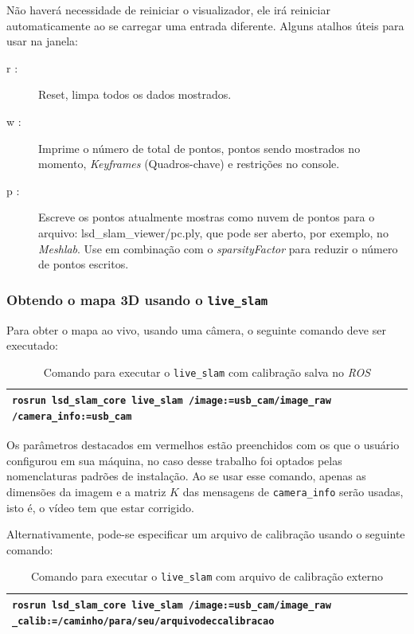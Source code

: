 Não haverá necessidade de reiniciar o visualizador, ele irá reiniciar automaticamente ao se carregar uma entrada diferente. Alguns atalhos úteis para usar na janela:

\begin{description}
	\item[r :]{Reset, limpa todos os dados mostrados.}
	\item[w :]{Imprime o número de total de pontos, pontos sendo mostrados no momento, \textit{Keyframes} (Quadros-chave) e restrições no console.}
	\item[p :]{Escreve os pontos atualmente mostras como nuvem de pontos para o arquivo: lsd\_slam\_viewer/pc.ply, que pode ser aberto, por exemplo, no \textit{Meshlab}. Use  em combinação com o \textit{sparsityFactor}  para reduzir o número de pontos escritos.}
\end{description}	

\subsubsection{Obtendo o mapa 3D usando o \texttt{live\_slam}}

Para obter o mapa ao vivo, usando uma câmera, o seguinte comando deve ser executado:

\begin{table}[!ht]\label{tb:14}
\begin{tabular}{| p{\textwidth}|}
\hline
\texttt{rosrun lsd\_slam\_core live\_slam /image:=usb\_cam/image\_raw /camera\_info:=usb\_cam}\\
\hline
\end{tabular}
\caption{Comando para executar o \texttt{live\_slam} com calibração salva no \textit{ROS}}
\end{table}

Os parâmetros destacados em vermelhos estão preenchidos com os que o usuário configurou em sua máquina, no caso desse trabalho foi optados pelas nomenclaturas padrões de instalação. Ao se usar esse comando, apenas as dimensões da imagem e a matriz $K$ das mensagens de \texttt{camera\_info} serão usadas, isto é, o vídeo tem que estar corrigido.

Alternativamente, pode-se especificar um arquivo de calibração usando o seguinte comando:

\begin{table}[!ht]\label{tb:15}
\begin{tabular}{| p{\textwidth}|}
\hline
\texttt{rosrun lsd\_slam\_core live\_slam /image:=usb\_cam/image\_raw \_calib:=/caminho/para/seu/arquivodeccalibracao}\\
\hline
\end{tabular}
\caption{Comando para executar o \texttt{live\_slam} com arquivo de calibração externo}
\end{table}

